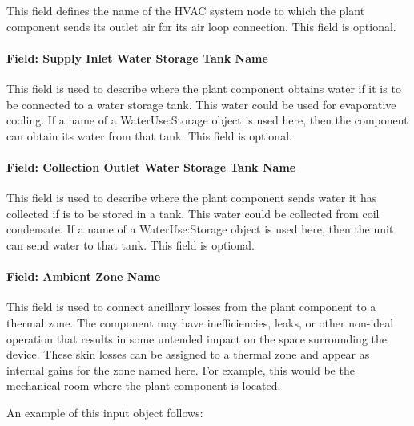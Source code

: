 This field defines the name of the HVAC system node to which the plant component sends its outlet air for its air loop connection. This field is optional.

\paragraph{Field: Supply Inlet Water Storage Tank Name}\label{field-supply-inlet-water-storage-tank-name-3}

This field is used to describe where the plant component obtains water if it is to be connected to a water storage tank. This water could be used for evaporative cooling. If a name of a WaterUse:Storage object is used here, then the component can obtain its water from that tank. This field is optional.

\paragraph{Field: Collection Outlet Water Storage Tank Name}\label{field-collection-outlet-water-storage-tank-name-3}

This field is used to describe where the plant component sends water it has collected if is to be stored in a tank. This water could be collected from coil condensate. If a name of a WaterUse:Storage object is used here, then the unit can send water to that tank. This field is optional.

\paragraph{Field: Ambient Zone Name}\label{field-ambient-zone-name-3}

This field is used to connect ancillary losses from the plant component to a thermal zone. The component may have inefficiencies, leaks, or other non-ideal operation that results in some untended impact on the space surrounding the device. These skin losses can be assigned to a thermal zone and appear as internal gains for the zone named here. For example, this would be the mechanical room where the plant component is located.

An example of this input object follows:

